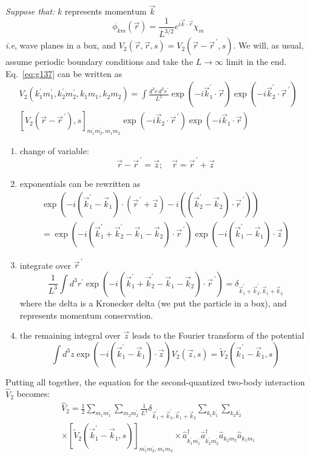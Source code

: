 \documentclass[12pt]{article}
\newcommand{\be}{\begin{equation}}
\newcommand{\ee}{\end{equation}}
\newcommand{\vecrp}{\ensuremath{\vec{r}^{\,\prime}}}
\begin{document}
\emph{Suppose that:} $k$ represents momentum $\vec{k}$
\be
\phi_{km}(\vec{r})=\frac{1}{L^{3 / 2}} e^{i \vec{k} \cdot \vec{r}} \chi_{m}
\ee
\textit{i.e}, wave planes in a box,
and
$V_{2}(\vec{r}, \vec{r}, s)=V_{2}\left(\vec{r}-\vecrp, s\right)$.
We will, as usual, assume periodic boundary conditions and take the $L \to \infty$ limit in the end.
Eq.~\eqref{eq:g137} can be written as
\be
\begin{gathered}
V_2(k_1^\prime m_1^\prime, k_2^\prime m_2^\prime, k_1 m_1, k_2 m_2)
= 
\int \frac{d^3r\,d^3r^\prime}{L^3}
\exp(-i\vec{k}_1^\prime\cdot\vec{r})
\exp(-i\vec{k}_2^\prime\cdot\vecrp)\\
[V_2(\vec{r}-\vecrp),s]_{m_1^\prime m_2^\prime, m_1 m_2}
\exp(-i\vec{k}_2       \cdot\vecrp)
\exp(-i\vec{k}_1       \cdot\vec{r})
\end{gathered}
\ee
%
\begin{enumerate}
\item change of variable:
\be 
\vec{r}-\vecrp = \vec{z}; \quad \vec{r} = \vecrp + \vec{z} 
\ee
%
\item exponentials can be rewritten as
\be
\begin{gathered}
\exp(-i(\vec{k}_1^\prime-\vec{k}_1)\cdot(\vecrp+\vec{z})
	 -i((\vec{k}_2^\prime-\vec{k}_2)\cdot\vecrp))\\
= \exp(-i(\vec{k}_1^\prime + \vec{k}_2^\prime 
		 -\vec{k}_1        - \vec{k}_2)\cdot\vecrp)
  \exp(-i(\vec{k}_1^\prime - \vec{k}_1)\cdot\vec{z})
\end{gathered}
\ee
%
\item integrate over $\vecrp$
\be
\frac{1}{L^3} \int d^3r^\prime
\exp(-i(\vec{k}_1^\prime + \vec{k}_2^\prime 
	   -\vec{k}_1        - \vec{k}_2)\cdot\vecrp)
= \delta_{\vec{k}_1^\prime + \vec{k}_2^\prime, \vec{k}_1+\vec{k}_2}	
\ee
where the delta is a Kronecker delta (we put the particle in a box),
and represents momentum conservation.
%
\item the remaining integral over $\vec{z}$ leads to the Fourier
transform of the potential
\be
\int d^3z \exp(-i(\vec{k}_1^\prime - \vec{k}_1)\cdot\vec{z})
V_2(\vec{z},s) = \widetilde{V}_2(\vec{k}_1^\prime - \vec{k}_1, s)
\ee
\end{enumerate}
Putting all together, the equation for the second-quantized two-body interaction $\hat{V}_2$ becomes:
\be
\begin{gathered}
\hat{V}_2 = \frac{1}{2}
\sum_{m_1m_1^\prime}\sum_{m_2m_2^\prime}
\frac{1}{L^3} \delta_{\vec{k}_1^\prime + \vec{k}_2^\prime, \vec{k}_1+\vec{k}_2}
\sum_{k_1k_1^\prime}\sum_{k_2k_2^\prime}\\
\times
[\widetilde{V}_2(\vec{k}_1^\prime - \vec{k}_1, s)]_{m_1^\prime m_2^\prime, m_1 m_2}
\times 
\hat{a}_{k_1^\prime m_1^\prime}^{\dagger} \hat{a}_{k_2^\prime m_2^\prime}^{\dagger} 
\hat{a}_{k_2 m_2} \hat{a}_{k_1 m_1}
\end{gathered}
\label{eq:g144}
\ee
\end{document}
